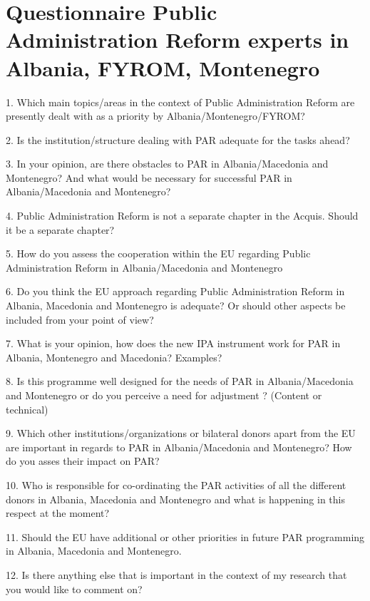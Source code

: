 \chapter{Questionnaire Public Administration Reform experts in Albania, FYROM, Montenegro}

1. Which main topics/areas in the context of Public Administration Reform are presently dealt with as a priority by Albania/Montenegro/FYROM?

2. Is the institution/structure dealing with PAR adequate for the tasks ahead? 

3. In your opinion, are there obstacles to PAR in Albania/Macedonia and Montenegro? And what would be necessary for successful PAR in Albania/Macedonia and Montenegro? 

4. Public Administration Reform is not a separate chapter in the Acquis. Should it be a separate chapter? 

5. How do you assess the cooperation within the EU regarding Public Administration Reform in Albania/Macedonia and Montenegro 

6. Do you think the EU approach regarding Public Administration Reform in Albania, Macedonia and Montenegro is adequate? Or should other aspects be included from your point of view?

7. What is your opinion, how does the new IPA instrument work for PAR in Albania, Montenegro and Macedonia? Examples?

8. Is this programme well designed for the needs of PAR in Albania/Macedonia and Montenegro or do you perceive a need for adjustment ? (Content or technical)

9. Which other institutions/organizations or bilateral donors apart from the EU are important in regards to PAR in Albania/Macedonia and Montenegro? How do you asses their impact on PAR? 

10. Who is responsible for co-ordinating the PAR activities of all the different donors in Albania, Macedonia and Montenegro and what is happening in this respect at the moment? 

11. Should the EU have additional or other priorities in future PAR programming in Albania, Macedonia and Montenegro. 

12. Is there anything else that is important in the context of my research that you would like to comment on?